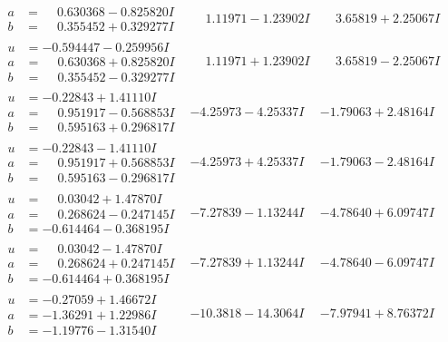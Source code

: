 \documentclass[1p]{elsarticle_modified}
\theoremstyle{definition}
\begin{document}
$$\begin{array}{c|c|c}
\begin{aligned}
a &= \phantom{-}0.630368 - 0.825820 I \\
b &= \phantom{-}0.355452 + 0.329277 I\end{aligned}
 & \phantom{-}1.11971 - 1.23902 I & \phantom{-}3.65819 + 2.25067 I \\ \hline\begin{aligned}
u &= -0.594447 - 0.259956 I \\
a &= \phantom{-}0.630368 + 0.825820 I \\
b &= \phantom{-}0.355452 - 0.329277 I\end{aligned}
 & \phantom{-}1.11971 + 1.23902 I & \phantom{-}3.65819 - 2.25067 I \\ \hline\begin{aligned}
u &= -0.22843 + 1.41110 I \\
a &= \phantom{-}0.951917 - 0.568853 I \\
b &= \phantom{-}0.595163 + 0.296817 I\end{aligned}
 & -4.25973 - 4.25337 I & -1.79063 + 2.48164 I \\ \hline\begin{aligned}
u &= -0.22843 - 1.41110 I \\
a &= \phantom{-}0.951917 + 0.568853 I \\
b &= \phantom{-}0.595163 - 0.296817 I\end{aligned}
 & -4.25973 + 4.25337 I & -1.79063 - 2.48164 I \\ \hline\begin{aligned}
u &= \phantom{-}0.03042 + 1.47870 I \\
a &= \phantom{-}0.268624 - 0.247145 I \\
b &= -0.614464 - 0.368195 I\end{aligned}
 & -7.27839 - 1.13244 I & -4.78640 + 6.09747 I \\ \hline\begin{aligned}
u &= \phantom{-}0.03042 - 1.47870 I \\
a &= \phantom{-}0.268624 + 0.247145 I \\
b &= -0.614464 + 0.368195 I\end{aligned}
 & -7.27839 + 1.13244 I & -4.78640 - 6.09747 I \\ \hline\begin{aligned}
u &= -0.27059 + 1.46672 I \\
a &= -1.36291 + 1.22986 I \\
b &= -1.19776 - 1.31540 I\end{aligned}
 & -10.3818 - 14.3064 I & -7.97941 + 8.76372 I \\ \hline\begin{aligned}

\end{aligned}
\end{array}$$
\end{document}
